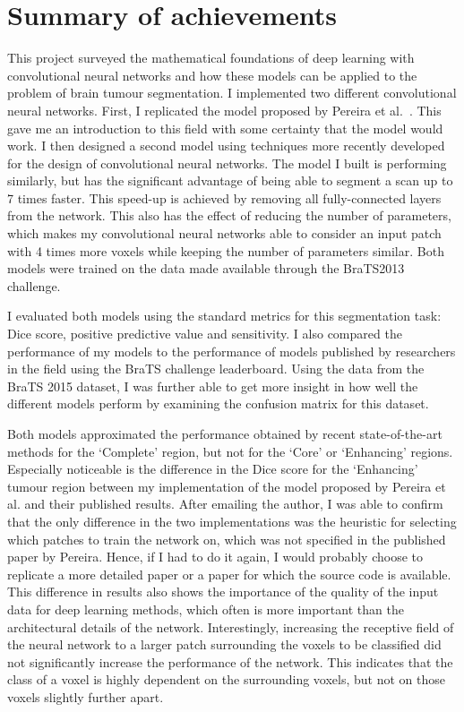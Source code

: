\documentclass[12pt,a4paper,twoside,openright]{report}
\begin{document}
\section{Summary of achievements}
This project surveyed the mathematical foundations of deep learning with convolutional neural networks and how these models can be applied to the problem of brain tumour segmentation. I implemented two different convolutional neural networks. First, I replicated the model proposed by Pereira et al.\ \cite{pereira}. This gave me an introduction to this field with some certainty that the model would work. I then designed a second model using techniques more recently developed for the design of convolutional neural networks. The model I built is performing similarly, but has the significant advantage of being able to segment a scan up to 7 times faster. This speed-up is achieved by removing all fully-connected layers from the network. This also has the effect of reducing the number of parameters, which makes my convolutional neural networks able to consider an input patch with 4 times more voxels while keeping the number of parameters similar. Both models were trained on the data made available through the BraTS2013 challenge.

I evaluated both models using the standard metrics for this segmentation task: Dice score, positive predictive value and sensitivity. I also compared the performance of my models to the performance of models published by researchers in the field using the BraTS challenge leaderboard. Using the data from the BraTS 2015 dataset, I was further able to get more insight in how well the different models perform by examining the confusion matrix for this dataset.

Both models approximated the performance obtained by recent state-of-the-art methods for the `Complete' region, but not for the `Core' or `Enhancing' regions. Especially noticeable is the difference in the Dice score for the `Enhancing' tumour region between my implementation of the model proposed  by Pereira et al. and their published results. After emailing the author, I was able to confirm that the only difference in the two implementations was the heuristic for selecting which patches to train the network on, which was not specified in the published paper by Pereira. Hence, if I had to do it again, I would probably choose to replicate a more detailed paper or a paper for which the source code is available. This difference in results also shows the importance of the quality of the input data for deep learning methods, which often is more important than the architectural details of the network. Interestingly, increasing the receptive field of the neural network to a larger patch surrounding the voxels to be classified did not significantly increase the performance of the network. This indicates that the class of a voxel is highly dependent on the surrounding voxels, but not on those voxels slightly further apart.
\end{document}
